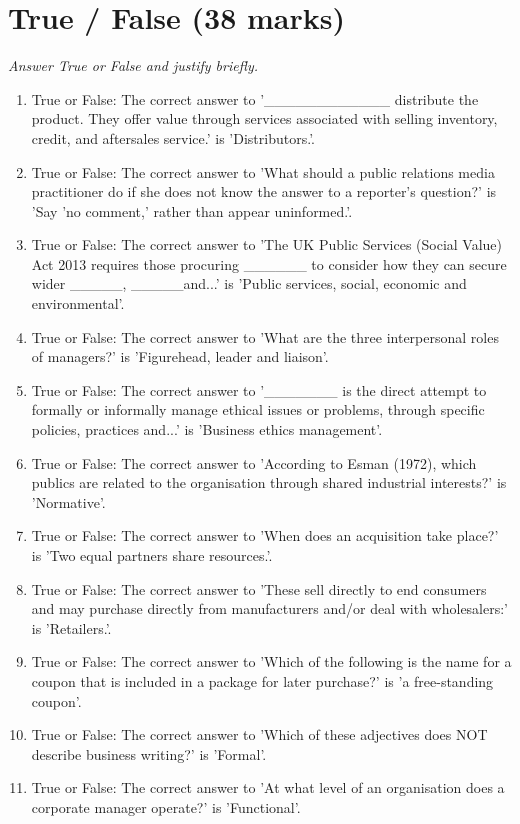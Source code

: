 \documentclass[12pt]{article}
\begin{document}
\section*{True / False (38 marks)}
\textit{Answer True or False and justify briefly.}
\begin{enumerate}[label=\arabic*.]
\item True or False: The correct answer to '\_\_\_\_\_\_\_\_\_\_\_\_ distribute the product. They offer value through services associated with selling inventory, credit, and aftersales service.' is 'Distributors.'.
\item True or False: The correct answer to 'What should a public relations media practitioner do if she does not know the answer to a reporter's question?' is 'Say 'no comment,' rather than appear uninformed.'.
\item True or False: The correct answer to 'The UK Public Services (Social Value) Act 2013 requires those procuring \_\_\_\_\_\_ to consider how they can secure wider \_\_\_\_\_, \_\_\_\_\_and...' is 'Public services, social, economic and environmental'.
\item True or False: The correct answer to 'What are the three interpersonal roles of managers?' is 'Figurehead, leader and liaison'.
\item True or False: The correct answer to '\_\_\_\_\_\_\_ is the direct attempt to formally or informally manage ethical issues or problems, through specific policies, practices and...' is 'Business ethics management'.
\item True or False: The correct answer to 'According to Esman (1972), which publics are related to the organisation through shared industrial interests?' is 'Normative'.
\item True or False: The correct answer to 'When does an acquisition take place?' is 'Two equal partners share resources.'.
\item True or False: The correct answer to 'These sell directly to end consumers and may purchase directly from manufacturers and/or deal with wholesalers:' is 'Retailers.'.
\item True or False: The correct answer to 'Which of the following is the name for a coupon that is included in a package for later purchase?' is 'a free-standing coupon'.
\item True or False: The correct answer to 'Which of these adjectives does NOT describe business writing?' is 'Formal'.
\item True or False: The correct answer to 'At what level of an organisation does a corporate manager operate?' is 'Functional'.

\end{enumerate}
\end{document}
